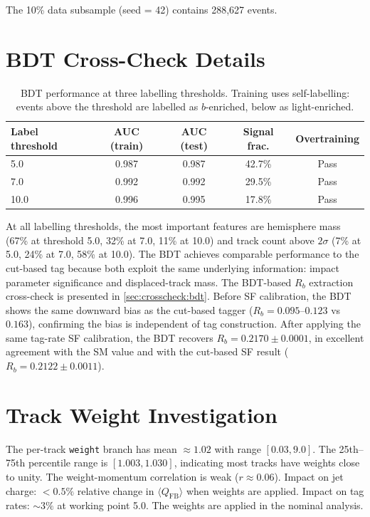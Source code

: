 \documentclass[11pt,a4paper]{article}
\begin{document}
The 10\% data subsample (seed = 42) contains 288,627 events.

\section{BDT Cross-Check Details}
\label{app:bdt}

\begin{table}[htbp]
\centering
\caption{BDT performance at three labelling thresholds.
Training uses self-labelling: events above the threshold are
labelled as $b$-enriched, below as light-enriched.}
\label{tbl:bdt}
\begin{tabular}{lcccc}
\toprule
Label threshold & AUC (train) & AUC (test) & Signal frac. &
Overtraining \\
\midrule
5.0  & 0.987 & 0.987 & 42.7\% & Pass \\
7.0  & 0.992 & 0.992 & 29.5\% & Pass \\
10.0 & 0.996 & 0.995 & 17.8\% & Pass \\
\bottomrule
\end{tabular}
\end{table}

At all labelling thresholds, the most important features are
hemisphere mass (67\% at threshold 5.0, 32\% at 7.0, 11\% at 10.0)
and track count above $2\sigma$ (7\% at 5.0, 24\% at 7.0, 58\%
at 10.0).
The BDT achieves comparable performance to the cut-based tag because
both exploit the same underlying information: impact parameter
significance and displaced-track mass.
The BDT-based $R_b$ extraction cross-check is presented in
\cref{sec:crosscheck:bdt}. Before SF calibration, the BDT shows the
same downward bias as the cut-based tagger ($R_b = 0.095$--$0.123$
vs $0.163$), confirming the bias is independent of tag construction.
After applying the same tag-rate SF calibration, the BDT recovers
$R_b = 0.2170 \pm 0.0001$, in excellent agreement with the SM value
and with the cut-based SF result ($R_b = 0.2122 \pm 0.0011$).

\section{Track Weight Investigation}
\label{app:weights}

The per-track \texttt{weight} branch has mean $\approx 1.02$
with range $[0.03, 9.0]$.
The 25th--75th percentile range is $[1.003, 1.030]$, indicating
most tracks have weights close to unity.
The weight-momentum correlation is weak ($r \approx 0.06$).
Impact on jet charge: $< 0.5\%$ relative change in
$\langle Q_\text{FB}\rangle$ when weights are applied.
Impact on tag rates: $\sim 3\%$ at working point 5.0.
The weights are applied in the nominal analysis.
\end{document}
